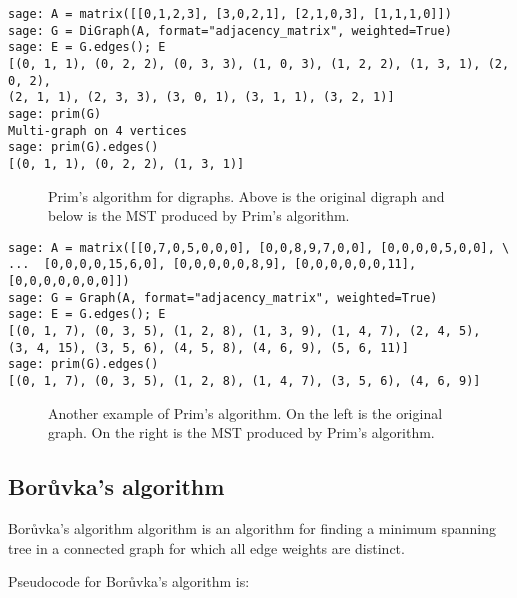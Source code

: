 \begin{lstlisting}
sage: A = matrix([[0,1,2,3], [3,0,2,1], [2,1,0,3], [1,1,1,0]])
sage: G = DiGraph(A, format="adjacency_matrix", weighted=True)
sage: E = G.edges(); E
[(0, 1, 1), (0, 2, 2), (0, 3, 3), (1, 0, 3), (1, 2, 2), (1, 3, 1), (2, 0, 2),
(2, 1, 1), (2, 3, 3), (3, 0, 1), (3, 1, 1), (3, 2, 1)]
sage: prim(G)
Multi-graph on 4 vertices
sage: prim(G).edges()
[(0, 1, 1), (0, 2, 2), (1, 3, 1)]
\end{lstlisting}

\begin{figure}[!htbp]
\centering

\caption{Prim's algorithm for digraphs. Above is the original digraph
  and below is the MST produced by Prim's algorithm.}
\label{fig:tree-forests:Prim_algorithm_digraph}
\end{figure}

\begin{lstlisting}
sage: A = matrix([[0,7,0,5,0,0,0], [0,0,8,9,7,0,0], [0,0,0,0,5,0,0], \
...  [0,0,0,0,15,6,0], [0,0,0,0,0,8,9], [0,0,0,0,0,0,11], [0,0,0,0,0,0,0]])
sage: G = Graph(A, format="adjacency_matrix", weighted=True)
sage: E = G.edges(); E
[(0, 1, 7), (0, 3, 5), (1, 2, 8), (1, 3, 9), (1, 4, 7), (2, 4, 5),
(3, 4, 15), (3, 5, 6), (4, 5, 8), (4, 6, 9), (5, 6, 11)]
sage: prim(G).edges()
[(0, 1, 7), (0, 3, 5), (1, 2, 8), (1, 4, 7), (3, 5, 6), (4, 6, 9)]
\end{lstlisting}

\begin{figure}[!htbp]
\centering

\caption{Another example of Prim's algorithm. On the left is the
  original graph. On the right is the MST produced by Prim's algorithm.}
\label{fig:tree-forests:Prim_algorithm_digraph2}
\end{figure}


\subsection{Bor\r{u}vka's algorithm}

Bor\r{u}vka's algorithm algorithm is an algorithm
for finding a minimum spanning tree in a connected graph for
which all edge weights are distinct.

Pseudocode for Bor\r{u}vka's algorithm is:

